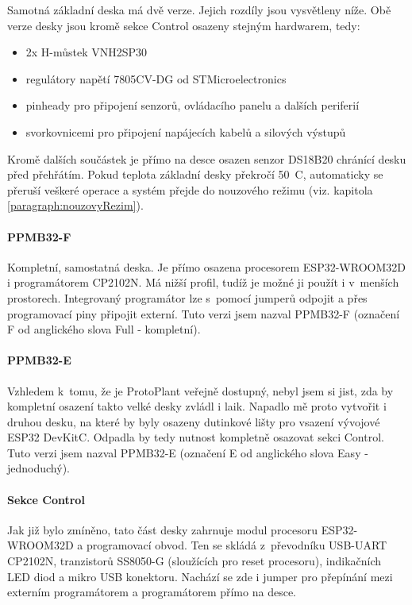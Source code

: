 Samotná základní deska má dvě verze. Jejich rozdíly jsou vysvětleny níže.
Obě verze desky jsou kromě sekce Control osazeny stejným hardwarem, tedy:

\begin{itemize}
    \item 2x H-můstek VNH2SP30
    \item regulátory napětí 7805CV-DG od STMicroelectronics
    \item pinheady pro připojení senzorů, ovládacího panelu a dalších periferií
    \item svorkovnicemi pro připojení napájecích kabelů a silových výstupů
\end{itemize}

Kromě dalších součástek je přímo na desce osazen senzor DS18B20 chránící desku před přehřátím. 
Pokud teplota základní desky překročí 50~\degree C, automaticky se přeruší veškeré operace a systém přejde do nouzového režimu (viz. kapitola \ref{paragraph:nouzovyRezim}).

\paragraph{PPMB32-F}
Kompletní, samostatná deska. 
Je přímo osazena procesorem ESP32-WROOM32D i programátorem CP2102N. 
Má nižší profil, tudíž je možné ji použít i v~menších prostorech.
Integrovaný programátor lze s~pomocí jumperů odpojit a přes programovací piny připojit externí. Tuto verzi jsem nazval PPMB32-F (označení F od anglického slova Full - kompletní).

\paragraph{PPMB32-E}
Vzhledem k~tomu, že je ProtoPlant veřejně dostupný, nebyl jsem si jist, zda by kompletní osazení takto velké desky zvládl i laik. 
Napadlo mě proto vytvořit i druhou desku, na které by byly osazeny dutinkové lišty pro vsazení vývojové ESP32 DevKitC. 
Odpadla by tedy nutnost kompletně osazovat sekci Control. 
Tuto verzi jsem nazval PPMB32-E (označení E od anglického slova Easy - jednoduchý).

\paragraph{Sekce Control}
Jak již bylo zmíněno, tato část desky zahrnuje modul procesoru ESP32-WROOM32D a programovací obvod. 
Ten se skládá z~převodníku USB-UART CP2102N, tranzistorů SS8050-G (sloužících pro reset procesoru), indikačních LED diod a mikro USB konektoru. 
Nachází se zde i jumper pro přepínání mezi externím programátorem a programátorem přímo na desce.

